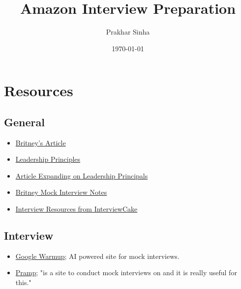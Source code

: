 \documentclass{article}
\title{Amazon Interview Preparation}
\author{Prakhar Sinha}
\date{\today}
\begin{document}
\maketitle

\section{Resources}
\subsection{General}
\begin{itemize}
\item \href{https://medium.com/@brii.nguyen/how-i-landed-an-internship-at-amazon-2024-having-only-applied-to-here-e5d601a34b22}{Britney's Article}
\item \href{https://www.amazon.jobs/content/en/our-workplace/leadership-principles}{Leadership Principles}
\item \href{https://www.aboutamazon.com/news/workplace/what-do-each-of-amazons-leadership-principles-really-mean}{Article Expanding on Leadership Principals}
\item \href{https://docs.google.com/document/d/1K10A6a3XzRr9PXnlBlxbPvlhWFe7tqQTXuYdU4ggF4M/edit?usp=sharing}{Britney Mock Interview Notes}
\item \href{https://www.interviewcake.com/data-structures-reference}{Interview Resources from InterviewCake}
\end{itemize}

\subsection{Interview}
\begin{itemize}
\item \href{https://grow.google/certificates/interview-warmup/category/}{Google Warmup}; AI powered site for mock interviews.
\item \href{https://www.pramp.com/#/}{Pramp}; "is a site to conduct mock interviews on and it is really useful for this."
\end{itemize}
\end{document}
